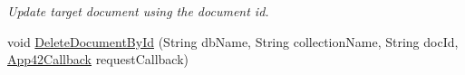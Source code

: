 \begin{DoxyCompactItemize}
\begin{DoxyCompactList}\small\item\em Update target document using the document id. \end{DoxyCompactList}\item 
\hypertarget{classcom_1_1shephertz_1_1app42_1_1paas_1_1sdk_1_1windows_1_1storage_1_1_storage_service_a007c2eec36b395b37b96dadfff321592}{void \hyperlink{classcom_1_1shephertz_1_1app42_1_1paas_1_1sdk_1_1windows_1_1storage_1_1_storage_service_a007c2eec36b395b37b96dadfff321592}{Delete\+Document\+By\+Id} (String db\+Name, String collection\+Name, String doc\+Id, \hyperlink{interfacecom_1_1shephertz_1_1app42_1_1paas_1_1sdk_1_1windows_1_1_app42_callback}{App42\+Callback} request\+Callback)}\label{classcom_1_1shephertz_1_1app42_1_1paas_1_1sdk_1_1windows_1_1storage_1_1_storage_service_a007c2eec36b395b37b96dadfff321592}


\end{DoxyCompactItemize}
